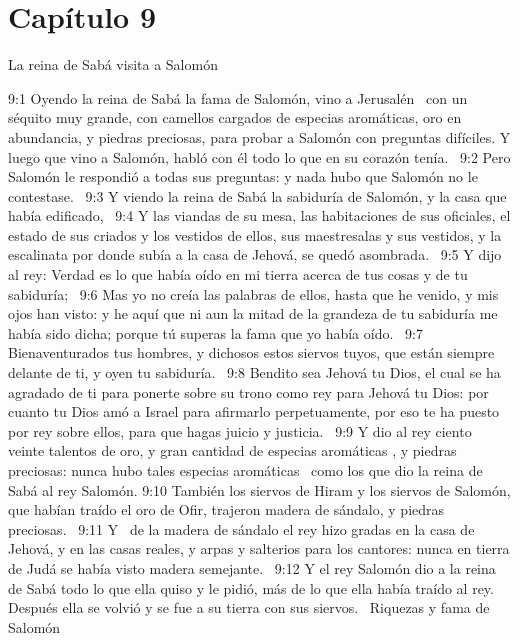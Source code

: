 								\section*{Capítulo 9}
									La reina de Sabá visita a Salomón   
									
									9:1 Oyendo la reina de Sabá la fama de Salomón, vino a Jerusalén  con un séquito muy grande, con camellos cargados de especias aromáticas, oro en abundancia, y piedras preciosas, para probar a Salomón con preguntas difíciles. Y luego que vino a Salomón, habló con él todo lo que en su corazón tenía.  
									9:2 Pero Salomón le respondió a todas sus preguntas: y nada hubo que Salomón no le contestase.  
									9:3 Y viendo la reina de Sabá la sabiduría de Salomón, y la casa que había edificado,  
									9:4 Y las viandas de su mesa, las habitaciones de sus oficiales, el estado de sus criados y los vestidos de ellos, sus maestresalas y sus vestidos, y la escalinata por donde subía a la casa de Jehová, se quedó asombrada.  
									9:5 Y dijo al rey: Verdad es lo que había oído en mi tierra acerca de tus cosas y de tu sabiduría;  
									9:6 Mas yo no creía las palabras de ellos, hasta que he venido, y mis ojos han visto: y he aquí que ni aun la mitad de la grandeza de tu sabiduría me había sido dicha; porque tú superas la fama que yo había oído.  
									9:7 Bienaventurados tus hombres, y dichosos estos siervos tuyos, que están siempre delante de ti, y oyen tu sabiduría.  
									9:8 Bendito sea Jehová tu Dios, el cual se ha agradado de ti para ponerte sobre su trono como rey para Jehová tu Dios: por cuanto tu Dios amó a Israel para afirmarlo perpetuamente, por eso te ha puesto por rey sobre ellos, para que hagas juicio y justicia.  
									9:9 Y dio al rey ciento veinte talentos de oro, y gran cantidad de especias aromáticas , y piedras preciosas: nunca hubo tales especias aromáticas  como los que dio la reina de Sabá al rey Salomón. 
									9:10 También los siervos de Hiram y los siervos de Salomón, que habían traído el oro de Ofir, trajeron madera de sándalo, y piedras preciosas.  
									9:11 Y  de la madera de sándalo el rey hizo gradas en la casa de Jehová, y en las casas reales, y arpas y salterios para los cantores: nunca en tierra de Judá se había visto madera semejante.  
									9:12 Y el rey Salomón dio a la reina de Sabá todo lo que ella quiso y le pidió, más de lo que ella había traído al rey. Después ella se volvió y se fue a su tierra con sus siervos.  
									Riquezas y fama de Salomón  
									

